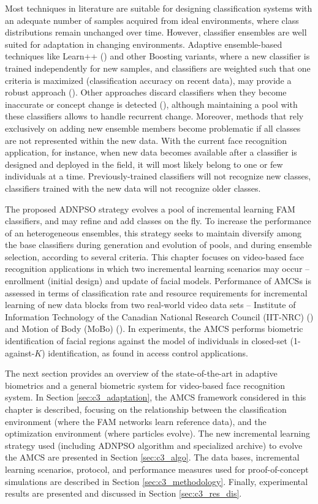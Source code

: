 Most techniques in literature are suitable for designing classification systems with an adequate number of samples acquired from ideal environments, where class distributions remain unchanged over time. However, classifier ensembles are well suited for adaptation in changing environments. Adaptive ensemble-based techniques like Learn++ (\cite{polikar01}) and other Boosting variants, where a new classifier is trained independently for new samples, and classifiers are weighted such that one criteria is maximized (classification accuracy on recent data), may provide a robust approach (\cite{minku10}). Other approaches discard classifiers when they become inaccurate or concept change is detected (\cite{nishida08}), although maintaining a pool with these classifiers allows to handle recurrent change. Moreover, methods that rely exclusively on adding new ensemble members become problematic if all classes are not represented within the new data. With the current face recognition application, for instance, when new data becomes available after a classifier is designed and deployed in the field, it will most likely belong to one or few individuals at a time. Previously-trained classifiers will not recognize new classes, classifiers trained with the new data will not recognize older classes.

The proposed ADNPSO strategy evolves a pool of incremental learning FAM classifiers, and may refine and add classes on the fly.
To increase the performance of an heterogeneous ensembles, this strategy seeks to maintain diversify among the base classifiers during generation and evolution of pools, and during ensemble selection, according to several criteria.
This chapter focuses on video-based face recognition applications in which two incremental learning scenarios may occur -- enrollment (initial design) and update of facial models.
Performance of AMCSs is assessed in terms of classification rate and resource requirements for incremental learning of new data blocks from two real-world video data sets -- Institute of Information Technology of the Canadian National Research Council (IIT-NRC) (\cite{gorodnichy05}) and Motion of Body (MoBo) (\cite{gross02}).
In experiments, the AMCS performs biometric identification of facial regions against the model of individuals in closed-set (1-against-$K$) identification, as found in access control applications.

The next section provides an overview of the state-of-the-art in adaptive biometrics and a general biometric system for video-based face recognition system.
In Section \ref{sec:c3_adaptation}, the AMCS framework considered in this chapter is described, focusing on the relationship between the classification environment (where the FAM networks learn reference data), and the optimization environment (where particles evolve).
The new incremental learning strategy used (including ADNPSO algorithm and specialized archive) to evolve the AMCS are presented in Section \ref{sec:c3_algo}.
The data bases, incremental learning scenarios, protocol, and performance measures used for proof-of-concept simulations are described in Section \ref{sec:c3_methodology}.
Finally, experimental results are presented and discussed in Section \ref{sec:c3_res_dis}.

